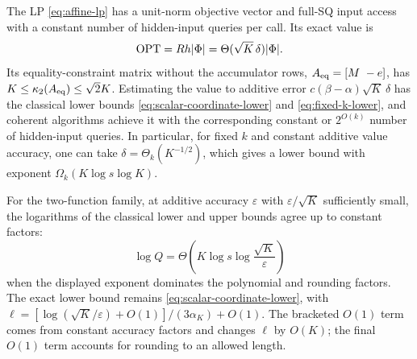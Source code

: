 \begin{theorem}\label{thm:affine-lp}
The LP \eqref{eq:affine-lp} has a unit-norm objective vector and
full-SQ input access with a constant number of hidden-input queries per call.  Its
exact value is
\begin{equation}\label{eq:affine-value}
 \operatorname{OPT}=Rh|\Phi|=\Theta(\sqrt K\,\delta)|\Phi|.
\end{equation}
Its equality-constraint matrix without the accumulator rows,
$A_{\rm eq}=[M\ -e]$, has
$K\leq\kappa_2(A_{\rm eq})\leq\sqrt2K$.
Estimating the value to additive error $c(\beta-\alpha)\sqrt K\,\delta$
has the classical lower bounds \eqref{eq:scalar-coordinate-lower} and
\eqref{eq:fixed-k-lower}, and coherent algorithms achieve it with the
corresponding constant or $2^{O(k)}$ number of hidden-input queries.  In
particular, for fixed $k$ and constant additive value accuracy, one can
take $\delta=\Theta_k(K^{-1/2})$, which gives a lower bound with exponent
$\Omega_k(K\log s\log K)$.

For the two-function family, at additive accuracy $\varepsilon$ with
$\varepsilon/\sqrt K$ sufficiently small, the logarithms of the classical
lower and upper bounds agree up to constant factors:
\begin{equation}\label{eq:affine-matched}
 \log Q=\Theta\left(K\log s\log\frac{\sqrt K}{\varepsilon}\right)
\end{equation}
when the displayed exponent dominates the polynomial and rounding
factors.  The exact lower bound remains
\eqref{eq:scalar-coordinate-lower}, with
$\ell=[\log(\sqrt K/\varepsilon)+O(1)]/(3\alpha_K)+O(1)$.
The bracketed $O(1)$ term comes from constant accuracy factors and
changes $\ell$ by $O(K)$; the final $O(1)$ term accounts for rounding to
an allowed length.
\end{theorem}

